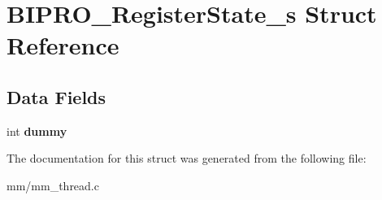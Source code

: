 \hypertarget{structBIPRO__RegisterState__s}{\section{B\-I\-P\-R\-O\-\_\-\-Register\-State\-\_\-s Struct Reference}
\label{structBIPRO__RegisterState__s}
}
\subsection*{Data Fields}
\begin{DoxyCompactItemize}
\item 
\hypertarget{structBIPRO__RegisterState__s_a1d4d1a11cb35f2770702f27032c827fe}{int {\bfseries dummy}}\label{structBIPRO__RegisterState__s_a1d4d1a11cb35f2770702f27032c827fe}

\end{DoxyCompactItemize}


The documentation for this struct was generated from the following file\-:\begin{DoxyCompactItemize}
\item 
mm/mm\-\_\-thread.\-c\end{DoxyCompactItemize}
